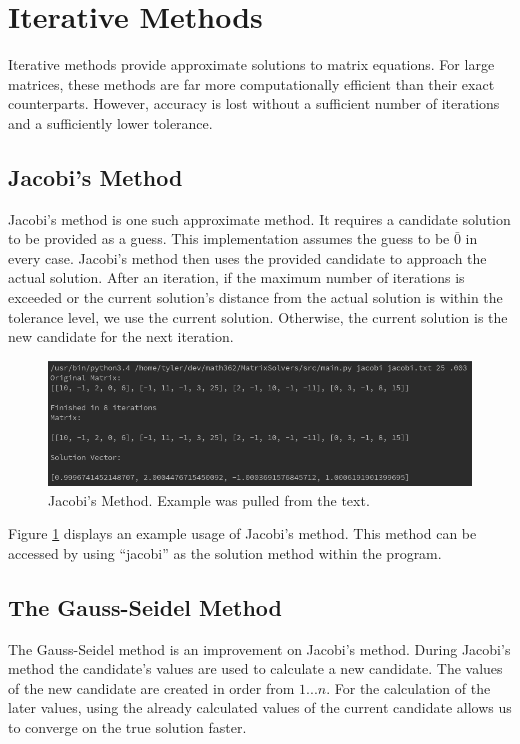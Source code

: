 \documentclass[12pt]{article}
\begin{document}
\section{Iterative Methods}
Iterative methods provide approximate solutions to matrix equations. For large
matrices, these methods are far more computationally efficient than their
exact counterparts\cite{numerical}. However, accuracy is lost without a sufficient number of 
iterations and a sufficiently lower tolerance. 

\subsection{Jacobi's Method}
Jacobi's method is one such approximate method. It requires a candidate solution
to be provided as a guess\cite{numerical}. This implementation assumes the guess to be $\bar{0}$ in 
every case. Jacobi's method then uses the provided candidate to approach the 
actual solution\cite{numerical}. After an iteration, if the maximum number of iterations is exceeded
or the current solution's distance from the actual solution is within the tolerance 
level, we use the current solution\cite{numerical}. Otherwise, the current solution is the new 
candidate for the next iteration\cite{numerical}. 
\begin{figure}[H]
\begin{center}
\includegraphics[scale=.5]{jacobi.png}
\caption{Jacobi's Method. Example was pulled from the text\cite{numerical}.}
\label{jacobi}
\end{center}
\end{figure}

Figure \ref{jacobi} displays an example usage of Jacobi's method. This method can be accessed by using ``jacobi''
as the solution method within the program.


\subsection{The Gauss-Seidel Method}
The Gauss-Seidel method is an improvement on Jacobi's method\cite{numerical}. During Jacobi's method
the candidate's values are used to calculate a new candidate\cite{numerical}. The values of the
new candidate are created in order from $1...n$\cite{numerical}. For the calculation of the later
values, using the already calculated values of the current candidate allows us 
to converge on the true solution faster\cite{numerical}.
\end{document}
